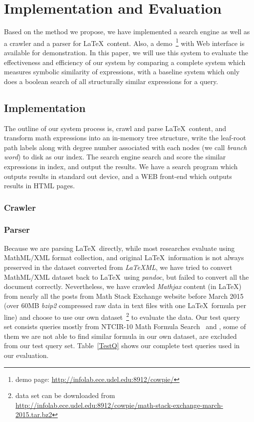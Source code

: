 \chapter{Implementation and Evaluation}
Based on the method we propose, we have implemented a search engine as well as a crawler and a parser for \LaTeX\ content. Also, a demo~\footnote{demo page: \url{http://infolab.ece.udel.edu:8912/cowpie/}} with Web interface is available for demonstration. 
In this paper, we will use this system to evaluate the effectiveness and efficiency of our system by comparing a complete system which measures symbolic similarity of expressions, with a baseline system which only does a boolean search of all structurally similar expressions for a query. 

\section{Implementation}
The outline of our system process is, crawl and parse \LaTeX\ content, and transform math expressions into an in-memory tree structure, write the leaf-root path labels along with degree number associated with each nodes (we call \textit{branch word}) to disk as our index. 
The search engine search and score the similar expressions in index, and output the results. 
We have a search program which outputs results in standard out device, and a WEB front-end which outputs results in HTML pages.

\subsection{Crawler}
\subsection{Parser}

Because we are parsing \LaTeX\ directly, while most researches evaluate using MathML/XML format collection, 
and original \LaTeX\ information is not always preserved in the dataset converted from \textit{LaTeXML}, 
we have tried to convert MathML/XML dataset back to \LaTeX\ using \textit{pandoc}, but failed to convert all the document correctly. 
Nevertheless, we have crawled \textit{Mathjax} content (in \LaTeX) from nearly all the posts from Math Stack Exchange website before March 2015 (over 60MB \textit{bzip2} compressed raw data in text files with one \LaTeX\ formula per line) and choose to use our own dataset~\footnote{data set can be downloaded from \url{http://infolab.ece.udel.edu:8912/cowpie/math-stack-exchange-march-2015.tar.bz2}} to evaluate the data.
Our test query set consists queries mostly from NTCIR-10 Math Formula Search~\cite{ntcirtopic} and \cite{symbolpairs15}, some of them we are not able to find similar formula in our own dataset, are excluded from our test query set.
Table~\ref{TestQ} shows our complete test queries used in our evaluation. 

